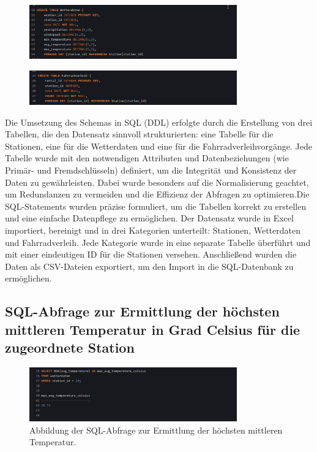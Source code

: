 \documentclass[a4paper,12pt]{article}
\begin{document}
\begin{figure}[h!]
\centering
\includegraphics[width=0.8\textwidth]{20241201_19514551.png}  %
\label{fig:bild2}
\end{figure}

\begin{figure}[h!]
\centering
\includegraphics[width=0.8\textwidth]{20241201_19515000.png}  %
\label{fig:bild3}
\end{figure}

Die Umsetzung des Schemas in SQL (DDL) erfolgte durch die Erstellung von drei Tabellen, die den Datensatz sinnvoll strukturierten: eine Tabelle für die Stationen, eine für die Wetterdaten und eine für die Fahrradverleihvorgänge. Jede Tabelle wurde mit den notwendigen Attributen und Datenbeziehungen (wie Primär- und Fremdschlüsseln) definiert, um die Integrität und Konsistenz der Daten zu gewährleisten. Dabei wurde besonders auf die Normalisierung geachtet, um Redundanzen zu vermeiden und die Effizienz der Abfragen zu optimieren.Die SQL-Statements wurden präzise formuliert, um die Tabellen korrekt zu erstellen und eine einfache Datenpflege zu ermöglichen.
Der Datensatz wurde in Excel importiert, bereinigt und in drei Kategorien unterteilt: Stationen, Wetterdaten und Fahrradverleih. Jede Kategorie wurde in eine separate Tabelle überführt und mit einer eindeutigen ID für die Stationen versehen. Anschließend wurden die Daten als CSV-Dateien exportiert, um den Import in die SQL-Datenbank zu ermöglichen.

\subsection{SQL-Abfrage zur Ermittlung der höchsten mittleren Temperatur in Grad Celsius für die zugeordnete Station}

\begin{figure}[h!]
\centering
\includegraphics[width=0.8\textwidth]{20241201_20055471.png}  %
\caption{Abbildung der SQL-Abfrage zur Ermittlung der höchsten mittleren Temperatur.}
\label{fig:sql_query}
\end{figure}
\end{document}
